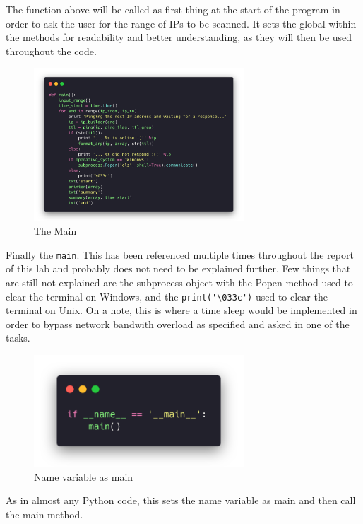 The function above will be called as first thing at the start of the
program in order to ask the user for the range of IPs to be scanned. It sets the
global within the methods for readability and better understanding, as they will
then be used throughout the code.

\begin{figure}[H]
  \centering
  \includegraphics[width=0.7\textwidth]{figures/code/main}
  \caption{The Main}
  \label{f:main}
\end{figure}

Finally the \lstinline{main}. This has been referenced multiple times throughout
the report of this lab and probably does not need to be explained further. Few
things that are still not explained are the subprocess object with the Popen
method used to clear the terminal on Windows, and the \lstinline{print('\033c')}
used to clear the terminal on Unix. On a note, this is where a time sleep would
be implemented in order to bypass network bandwith overload as specified and
asked in one of the tasks.

\begin{figure}[H]
  \centering
  \includegraphics[width=0.7\textwidth]{figures/code/namemain}
  \caption{Name variable as main}
  \label{f:namemain}
\end{figure}

As in almost any Python code, this sets the name variable as main and then call
the main method.

